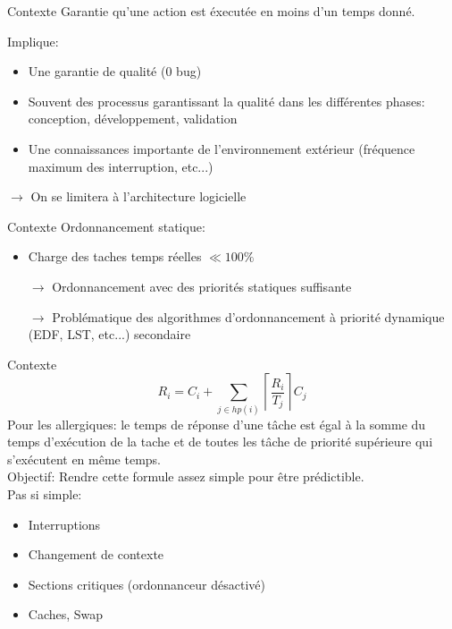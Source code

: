 \begin{frame}{Contexte}
  Garantie qu'une action est éxecutée en moins d'un temps donné.

  Implique:
  \begin{itemize}
    \item Une garantie de qualité (0 bug)
    \item Souvent des processus garantissant la qualité dans les différentes phases: conception, développement, validation
    \item Une connaissances importante de l'environnement extérieur (fréquence maximum des interruption, etc...)
  \end{itemize}
  $\to$ On se limitera à l'architecture logicielle
\end{frame}

\begin{frame}{Contexte}
  Ordonnancement statique:
  \begin{itemize}
    \item Charge des taches temps réelles $\ll 100\%$
    \item[$\to$] Ordonnancement avec des priorités statiques suffisante
    \item[$\to$] Problématique des algorithmes d'ordonnancement à priorité dynamique (EDF, LST, etc...) secondaire
  \end{itemize}
\end{frame}

\begin{frame}{Contexte}
$$
R_i = C_i + \sum_{j \in hp(i)} \left\lceil\frac{R_i}{T_j}\right\rceil C_j
$$
Pour les allergiques: le temps de réponse d'une tâche est égal à la somme du
temps d'exécution de la tache et de toutes les tâche de priorité supérieure
qui s'exécutent en même temps.\\[1.5ex]
Objectif: Rendre cette formule assez simple pour être prédictible.\\[1.5ex]
Pas si simple:
  \begin{itemize}
    \item Interruptions
    \item Changement de contexte
    \item Sections critiques (ordonnanceur désactivé)
    \item Caches, Swap
  \end{itemize}
\end{frame}

